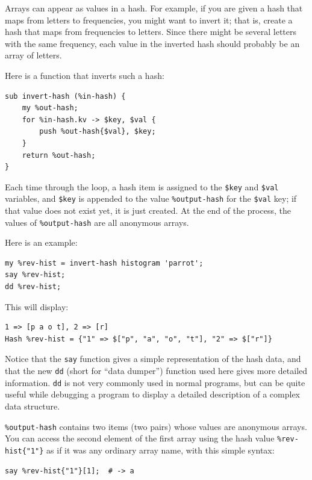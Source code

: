 Arrays can appear as values in a hash.  For example, if you
are given a hash that maps from letters to frequencies, you
might want to invert it; that is, create a hash that maps
from frequencies to letters.  Since there might be several 
letters with the same frequency, each value in the inverted hash 
should probably be an array of letters.

Here is a function that inverts such a hash:

\begin{verbatim}
sub invert-hash (%in-hash) { 
    my %out-hash; 
    for %in-hash.kv -> $key, $val {
        push %out-hash{$val}, $key; 
    }
    return %out-hash;
}
\end{verbatim}
%
Each time through the loop, a hash item is assigned to the  \verb'$key' and \verb'$val' variables, and \verb'$key' is 
appended to the value \verb'%output-hash' for the \verb'$val' 
key; if that value does not exist yet, it is just created. At 
the end of the process, the values of \verb'%output-hash' are 
all anonymous arrays.

Here is an example:

\begin{verbatim}
my %rev-hist = invert-hash histogram 'parrot';
say %rev-hist;
dd %rev-hist;
\end{verbatim}

This will display:

\begin{verbatim}
1 => [p a o t], 2 => [r]
Hash %rev-hist = {"1" => $["p", "a", "o", "t"], "2" => $["r"]}
\end{verbatim}

Notice that the {\tt say} function gives a simple representation 
of the hash data, and that the new {\tt dd} (short for ``data 
dumper'') function used here gives more detailed information. 
{\tt dd} is not very commonly used in normal programs, but 
can be quite useful while debugging a program to display a 
detailed description of a complex data structure.

\verb'%output-hash' contains two items (two pairs) whose 
values are anonymous arrays. You can access the second 
element of the first array using the hash value 
\verb'%rev-hist{"1"}' as if it was any ordinary array name, 
with this simple syntax:

\begin{verbatim}
say %rev-hist{"1"}[1];  # -> a
\end{verbatim}


